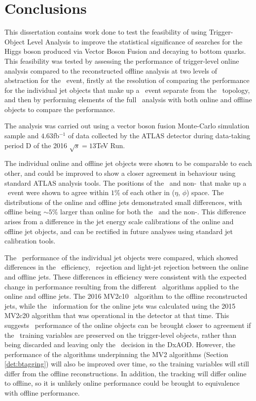 \chapter{Conclusions}
\label{c:c}

This dissertation contains work done to test the feasibility of using Trigger-Object Level Analysis to improve the statistical significance of searches for the Higgs boson produced via Vector Boson Fusion and decaying to bottom quarks. This feasibility was tested by assessing the performance of trigger-level online analysis compared to the reconstructed offline analysis at two levels of abstraction for the \VBFHBB\ event, firstly at the resolution of comparing the performance for the individual jet objects that make up a \VBFHBB\ event separate from the \VBFHBB\ topology, and then by performing elements of the full \VBFHBB\ analysis with both online and offline objects to compare the performance.

The analysis was carried out using a vector boson fusion Monte-Carlo simulation sample and $4.63$fb$^{-1}$ of data collected by the ATLAS detector during data-taking period D of the 2016 $\sqrt{s}=13$TeV Run.

The individual online and offline jet objects were shown to be comparable to each other, and could be improved to show a closer agreement in behaviour using standard ATLAS analysis tools. The positions of the \bjets\ and non-\bjets\ that make up a \VBFHBB\ event were shown to agree within $1\%$ of each other in ($\eta$, $\phi$) space. The \pt distributions of the online and offline jets demonstrated small differences, with offline \pt being $\sim5\%$ larger than online \pt for both the \bjets\ and the non-\bjets. This \pt difference arises from a difference in the jet energy scale calibrations of the online and offline jet objects, and can be rectified in future analyses using standard jet calibration tools.

The \btag\ performance of the individual jet objects were compared, which showed differences in the \btag\ efficiency, \cjet\ rejection and light-jet rejection between the online and offline jets. These differences in efficiency were consistent with the expected change in performance  resulting from the different \btag\ algorithms applied to the online and offline jets. The 2016 MV2c10 \btag\ algorithm to the offline reconstructed jets, while the \btag\ information for the online jets was calculated using the 2015 MV2c20 algorithm that was operational in the detector at that time. This suggests \btag\ performance of the online objects can be brought closer to agreement if the \btag\ training variables are preserved on the trigger-level objects, rather than being discarded and leaving only the \btag\ decision in the DxAOD. However, the performance of the algorithms underpinning the MV2 algorithms (Section \ref{det:btagging}) will also be improved over time, so the training variables will still differ from the offline reconstructions. In addition, the tracking will differ online to offline, so it is unlikely online performance could be brought to equivalence with offline performance.

